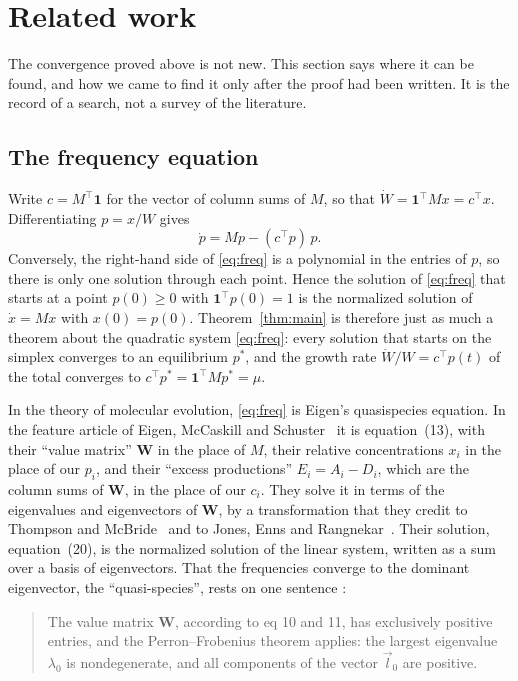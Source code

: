 \documentclass[11pt]{article}
\theoremstyle{definition}
\theoremstyle{remark}
\newcommand{\one}{\mathbf{1}}
\newcommand{\T}{\top}
\begin{document}
\section{Related work}\label{sec:related}

The convergence proved above is not new. This section says where it can be found, and how we
came to find it only after the proof had been written. It is the record of a search, not a
survey of the literature.

\subsection{The frequency equation}\label{sec:related:freq}

Write $c = M^\T \one$ for the vector of column sums of $M$, so that
$\dot{W} = \one^\T M x = c^\T x$. Differentiating $p = x/W$ gives
\begin{equation}\label{eq:freq}
  \dot{p} = Mp - (c^\T p)\, p .
\end{equation}
Conversely, the right-hand side of \eqref{eq:freq} is a polynomial in the entries of $p$, so
there is only one solution through each point. Hence the solution of \eqref{eq:freq} that starts
at a point $p(0) \ge 0$ with $\one^\T p(0) = 1$ is the normalized solution of $\dot{x} = Mx$
with $x(0) = p(0)$. Theorem~\ref{thm:main} is therefore just as much a theorem about the
quadratic system \eqref{eq:freq}: every solution that starts on the simplex converges to an
equilibrium $p^*$, and the growth rate $\dot{W}/W = c^\T p(t)$ of the total converges to
$c^\T p^* = \one^\T M p^* = \mu$.

In the theory of molecular evolution, \eqref{eq:freq} is Eigen's quasispecies equation. In the
feature article of Eigen, McCaskill and Schuster~\cite{EMS88} it is equation~(13), with their
``value matrix'' $\mathbf{W}$ in the place of $M$, their relative concentrations $x_i$ in the
place of our $p_i$, and their ``excess productions'' $E_i = A_i - D_i$, which are the column
sums of $\mathbf{W}$, in the place of our $c_i$. They solve it in terms of the eigenvalues and
eigenvectors of $\mathbf{W}$, by a transformation that they credit to Thompson and
McBride~\cite{TM74} and to Jones, Enns and Rangnekar~\cite{JER76}. Their solution, equation~(20),
is the normalized solution of the linear system, written as a sum over a basis of eigenvectors.
That the frequencies converge to the dominant eigenvector, the ``quasi-species'', rests on one
sentence \cite[p.~6885]{EMS88}:
\begin{quote}
The value matrix $\mathbf{W}$, according to eq 10 and 11, has exclusively positive entries, and
the Perron--Frobenius theorem applies: the largest eigenvalue $\lambda_0$ is nondegenerate, and
all components of the vector $\vec{l}_0$ are positive.
\end{quote}
\end{document}
